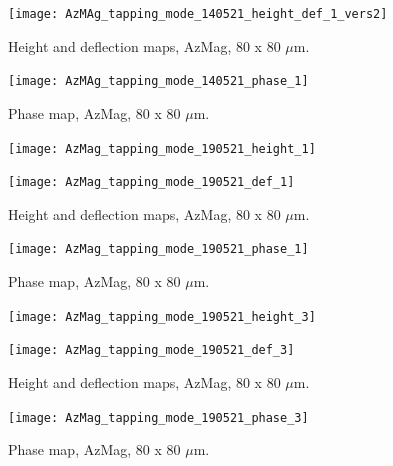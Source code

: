 \begin{figure}[H]
\centering
  \texttt{[image: AzMAg\_tapping\_mode\_140521\_height\_def\_1\_vers2]}
\caption[Height and deflection maps, AzMag]{Height and deflection maps, AzMag, 80 x 80 $\mu$m.}
\label{fig:afm_azmag_height_def_1}
\end{figure}

\begin{figure}[H]
\centering
  \texttt{[image: AzMAg\_tapping\_mode\_140521\_phase\_1]}
\caption[Phase map, AzMag]{Phase map, AzMag, 80 x 80 $\mu$m.}
\label{fig:afm_azmag_phase_1}
\end{figure}


\begin{figure}[H]
\centering
\begin{minipage}{.45\textwidth}
  \centering
  \texttt{[image: AzMag\_tapping\_mode\_190521\_height\_1]}
\end{minipage}
\begin{minipage}{.45\textwidth}
  \centering
  \texttt{[image: AzMag\_tapping\_mode\_190521\_def\_1]}
\end{minipage}
\caption[Height and deflection maps, AzMag]{Height and deflection maps, AzMag, 80 x 80 $\mu$m.}
\label{fig:afm_azmag_height_def_2}
\end{figure}

\begin{figure}[H]
\centering
  \texttt{[image: AzMag\_tapping\_mode\_190521\_phase\_1]}
\caption[Phase map, AzMag]{Phase map, AzMag, 80 x 80 $\mu$m.}
\label{fig:afm_azmag_phase_2}
\end{figure}


\begin{figure}[H]
\centering
\begin{minipage}{.45\textwidth}
  \centering
  \texttt{[image: AzMag\_tapping\_mode\_190521\_height\_3]}
\end{minipage}
\begin{minipage}{.45\textwidth}
  \centering
  \texttt{[image: AzMag\_tapping\_mode\_190521\_def\_3]}
\end{minipage}
\caption[Height and deflection maps, AzMag]{Height and deflection maps, AzMag, 80 x 80 $\mu$m.}
\label{fig:afm_azmag_height_def_3}
\end{figure}

\begin{figure}[H]
\centering
  \texttt{[image: AzMag\_tapping\_mode\_190521\_phase\_3]}
\caption[Phase map, AzMag]{Phase map, AzMag, 80 x 80 $\mu$m.}
\label{fig:afm_azmag_phase_3}
\end{figure}


